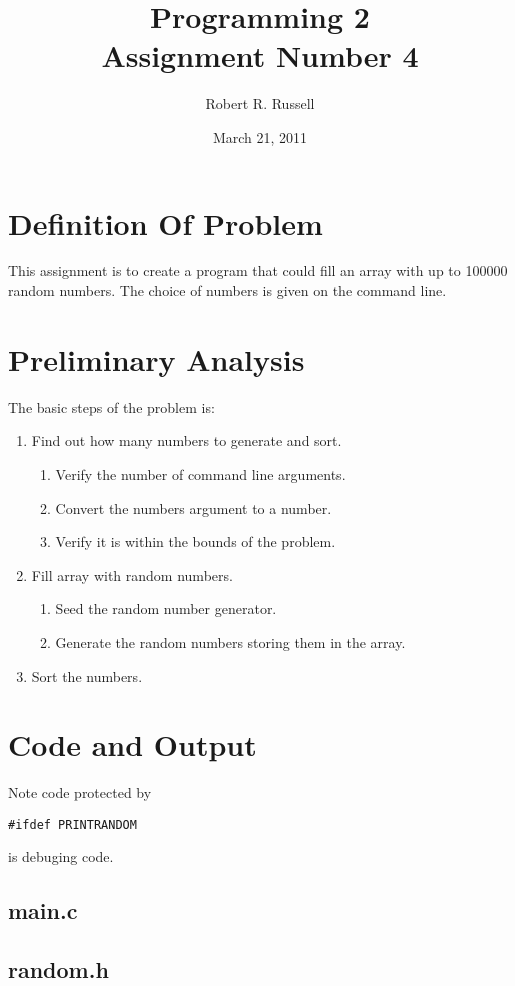 \documentclass[letterpaper,oneside]{scrartcl}
\title{Programming 2\\Assignment Number 4}
\author{Robert R. Russell}
\date{March 21, 2011}
\begin{document}
\maketitle

\section{Definition Of Problem}
This assignment is to create a program that could fill an array with up to 100000 random numbers.
The choice of numbers is given on the command line.
\section{Preliminary Analysis}
The basic steps of the problem is:
\begin{enumerate}
\item Find out how many numbers to generate and sort.
  \begin{enumerate}
  \item Verify the number of command line arguments.
  \item Convert the numbers argument to a number.
  \item Verify it is within the bounds of the problem.
  \end{enumerate}
\item Fill array with random numbers.
  \begin{enumerate}
  \item Seed the random number generator.
  \item Generate the random numbers storing them in the array.
  \end{enumerate}
\item Sort the numbers.
\end{enumerate}

\section{Code and Output}

Note code protected by
\begin{verbatim}
#ifdef PRINTRANDOM
\end{verbatim}
is debuging code.

\subsection{main.c}

\subsection{random.h}
\end{document}

